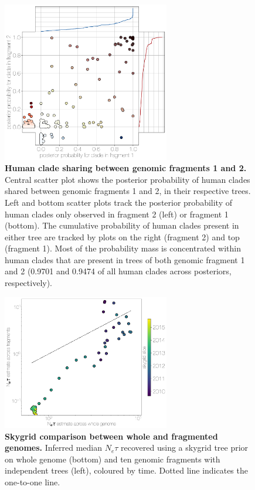 \documentclass[9pt,lineno]{elife}
\begin{document}
\begin{figure}[h]
\centering
	\includegraphics[width=0.65\textwidth]{figures/mers_flower.png}
	\caption{\textbf{Human clade sharing between genomic fragments 1 and 2.}
Central scatter plot shows the posterior probability of human clades shared between genomic fragments 1 and 2, in their respective trees.
Left and bottom scatter plots track the posterior probability of human clades only observed in fragment 2 (left) or fragment 1 (bottom).
The cumulative probability of human clades present in either tree are tracked by plots on the right (fragment 2) and top (fragment 1).
Most of the probability mass is concentrated within human clades that are present in trees of both genomic fragment 1 and 2 (0.9701 and 0.9474 of all human clades across posteriors, respectively).
	}
	\label{flower}
\end{figure}

\begin{figure}[h]
\centering
	\includegraphics[width=0.65\textwidth]{figures/mers_skygrid_comparison.png}
	\caption{\textbf{Skygrid comparison between whole and fragmented genomes.}
Inferred median $N_{e}\tau$ recovered using a skygrid tree prior on whole genome (bottom) and ten genomic fragments with independent trees (left), coloured by time.
Dotted line indicates the one-to-one line.
	}
	\label{skygrid_comparison}
\end{figure}
\end{document}
